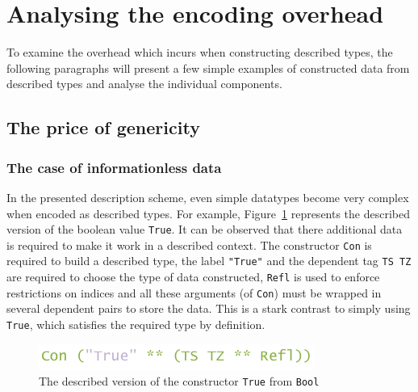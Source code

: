 \documentclass{ituthesis}
\newcommand{\ttconstructor}[1]{\textcolor{constructor-color}{\texttt{#1}}}
\newcommand{\tttype}[1]{\textcolor{type-color}{\texttt{#1}}}
\newcommand{\ttliteral}[1]{\textcolor{literal-color}{\texttt{#1}}}
\theoremstyle{break}
\begin{document}
\section{Analysing the encoding overhead}
\label{sec:Analysingtheencodingoverhead}

To examine the overhead which incurs when constructing described types, the following paragraphs will present a few simple examples of constructed data from described types and analyse the individual components.

\subsection{The price of genericity}
\label{sub:The price of genericity}

\subsubsection{The case of informationless data}
\label{ssub:The case of informationless data}

In the presented description scheme, even simple datatypes become very complex when encoded as described types.
For example, Figure~\ref{fig:overheadbool} represents the described version of the boolean value \ttconstructor{True}.
It can be observed that there additional data is required to make it work in a described context.
The constructor \ttconstructor{Con} is required to build a described type, the label \ttliteral{"True"} and the dependent tag \ttconstructor{TS~TZ} are required to choose the type of data constructed, \ttconstructor{Refl} is used to enforce restrictions on indices
and all these arguments (of \ttconstructor{Con}) must be wrapped in several dependent pairs to store the data.
This is a stark contrast to simply using \ttconstructor{True}, which satisfies the required type by definition.

\begin{figure}[ht]
\begin{center}
    \includegraphics[scale=0.5]{Figures/GenericsOverheadBool.png}
\end{center}
\caption{The described version of the constructor \ttconstructor{True} from \tttype{Bool}}
\label{fig:overheadbool}
\end{figure}
\end{document}
